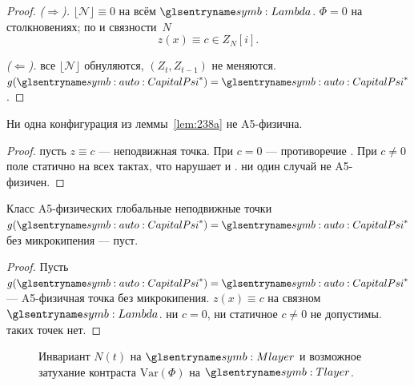 \begin{proof}
\emph{($\Rightarrow$).}
$\lfloor\mathcal{N}\rfloor\equiv 0$ на всём $\carrierLattice$.
\pfollows
$\Phi=0$ на столкновениях; по  и связности~$N$
\[
  z(x)\equiv c\in Z_N[i].
\]

\smallskip
\emph{($\Leftarrow$).}
все $\lfloor\mathcal{N}\rfloor$ обнуляются, $(Z_t,Z_{t-1})$ не меняются.
\phence $g(\symCapitalPsi^*)=\symCapitalPsi^*$.
\end{proof}

\begin{lemma}
\label{lem:238b}
Ни одна конфигурация из леммы~\ref{lem:238a} не A5-физична.
\end{lemma}

\begin{proof}
пусть $z\equiv c$ --- неподвижная точка.
При $c=0$ --- противоречие .
При $c\ne 0$ поле статично на всех тактах, что нарушает  и .
\phence ни один случай не A5-физичен.
\end{proof}

\begin{theorem}
\label{thm:238}
Класс A5-физических глобальные неподвижные точки $g(\symCapitalPsi^*)=\symCapitalPsi^*$ без микрокипения --- пуст.
\end{theorem}

\begin{proof}
Пусть $g(\symCapitalPsi^*)=\symCapitalPsi^*$ --- A5-физичная точка без микрокипения.
$z(x)\equiv c$ на связном~$\carrierLattice$.
ни $c=0$, ни статичное $c\ne 0$ не допустимы.
\phence таких точек нет.
\end{proof}

\begin{figure}[htbp]
  \centering
  
  \caption{Инвариант $N(t)$ на $\Mlayer$ и возможное затухание контраста $\mathrm{Var}(\Phi)$ на $\Tlayer$.}
  \label{fig:axiom-heat-death}
\end{figure}

